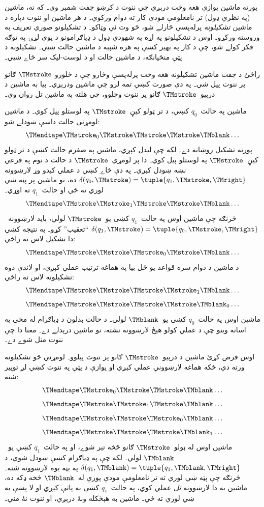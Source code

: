 \documentclass[../../../include/open-logic-section]{subfiles}
\begin{document}
\begin{explain}
پورته ماشين يوازې هغه وخت درېږي چې ننوت د کرښو جفت شمېر وي۔ که نه،
ماشين (په نظري ډول) تر نامعلومې مودې کار ته دوام ورکوي۔ د هر ماشين
او ننوت دپاره د ماشين \emph{تشکيلونه} پرله‌پسې څارلے شو، څو وت ئې
وټاکو۔ د تشکيلونو صوري تعريف به وروسته ورکړو۔ اوس د تشکيلونو په اړه
په شهودي ډول د ډياګرامونو د يوې لړۍ په توګه فکر کولے شو، چې د کار په
بهير کښې په هره شېبه د ماشين حالت ښيي۔ تشکيلونه د پټې منځپانګه، د
ماشين حالت او د لوست-ليک سر ځاے ښيي۔

راځئ د جفت ماشين تشکيلونه هغه وخت پرله‌پسې وڅارو چې د څلورو
$\TMstroke$ ګانو پر ننوت پيل شي۔ په دې صورت کښې تمه لرو چې ماشين
ودرېږي۔ بيا به ماشين د درېيو~$\TMstroke$ ګانو پر ننوت وچلوو، چې
هلته به ماشين تل روان وي۔

ماشين په حالت~$q_0$ کښې، د تر ټولو کيڼ~$\TMstroke$ په لوستلو پيل
کوي۔ د ماشين لومړنی حالت داسې ښودلے شو:
\[
\TMendtape \TMstroke_0 \TMstroke \TMstroke \TMstroke \TMblank \ldots
\]
پورته تشکيل روښانه دے۔ لکه چې ليدل کېږي، ماشين په صفرم حالت کښې د
تر ټولو کيڼ~$\TMstroke$ په لوستلو پيل کوي۔ دا پر لومړي~$\TMstroke$
د حالت د نوم په فرعي نښه ښودل کېږي۔
په دې ځاے کښې د عملي کېدو وړ لارښوونه
$\delta(q_0, \TMstroke) = \tuple{q_1, \TMstroke, \TMright}$ ده، نو
ماشين پر پټه ښي لوري ته ځي او حالت~$q_1$ ته اوړي۔
\[
\TMendtape \TMstroke \TMstroke_1 \TMstroke \TMstroke \TMblank \ldots
\]
څرنګه چې ماشين اوس په حالت~$q_1$ کښې يو~$\TMstroke$ لولي، بايد
لارښوونه~$\delta(q_1, \TMstroke) = \tuple{q_0,
  \TMstroke, \TMright}$ ``تعقيب'' کړو۔ په نتيجه کښې دا تشکيل لاس ته
راځي:
\[
\TMendtape \TMstroke \TMstroke \TMstroke_0 \TMstroke \TMblank \ldots
\]
د ماشين د دوام سره قواعد يو ځل بيا په هماغه ترتيب عملي کېږي، او
لاندې دوه تشکيلونه لاس ته راځي:
\[
\TMendtape \TMstroke \TMstroke \TMstroke \TMstroke_1 \TMblank \ldots
\]
\[
\TMendtape \TMstroke \TMstroke \TMstroke \TMstroke \TMblank_0 \ldots
\]
ماشين اوس په حالت~$q_0$ کښې يو~$\TMblank$ لولي۔ د حالت بدلون د
ډياګرام له مخې په اسانه وينو چې د عملي کولو هېڅ لارښوونه نشته، نو
ماشين درېدلے دے۔ معنا دا چې ننوت منل شوے دے۔

اوس فرض کړئ ماشين د درېيو~$\TMstroke$ ګانو پر ننوت پيلوو۔ لومړني
څو تشکيلونه ورته دي، ځکه هماغه لارښوونې عملي کېږي او يوازې د پټې په
ننوت کښې لږ توپير شته:
\[
\TMendtape \TMstroke_0 \TMstroke \TMstroke \TMblank \ldots
\]
\[
\TMendtape \TMstroke \TMstroke_1 \TMstroke \TMblank \ldots
\]
\[
\TMendtape \TMstroke \TMstroke \TMstroke_0 \TMblank \ldots
\]
\[
\TMendtape \TMstroke \TMstroke \TMstroke \TMblank_1 \ldots
\]
ماشين اوس له ټولو~$\TMstroke$ ګانو څخه تېر شوے، او په حالت~$q_1$
کښې يو~$\TMblank$ لولي۔ لکه چې په ډياګرام کښې ښودل شوې، د
$\delta(q_1, \TMblank) =\tuple{q_1,
\TMblank, \TMright}$ په بڼه يوه لارښوونه شته۔ څرنګه چې پټه ښي لوري
ته تر نامعلومې مودې پورې له~$\TMblank$ څخه ډکه ده، ماشين به دا
لارښوونه \emph{تل} عملي کوي، په حالت~$q_1$ کښې به پاتې کېږي او لا
پسې به ښي لوري ته ځي۔ ماشين به هېڅکله ونۀ درېږي، او ننوت نۀ مني۔
\end{explain}
\end{document}
